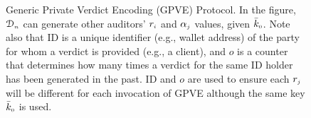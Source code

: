 \begin{figure}[!htp]
\begin{center}
\begin{tcolorbox}[enhanced,width=83mm, height=97mm, left=0mm,
    drop fuzzy shadow southwest,
    colframe=black,colback=white]
{{\begin{enumerate}[leftmargin=5.2mm]
%
%
%
%

 \end{enumerate}
}}
\end{tcolorbox}
\end{center}
\vspace{-4mm}
\caption{Generic Private Verdict Encoding  (GPVE) Protocol. In the figure, $\mathcal{D}_{\scriptscriptstyle n}$ can generate other auditors' $r_{\scriptscriptstyle i}$ and $\alpha_{\scriptscriptstyle j}$ values, given $\bar k_{\scriptscriptstyle 0}$. Note also that $\text{ID}$ is a unique identifier (e.g., wallet address) of the party for whom a verdict is provided (e.g., a client), and $o$ is a counter that determines how many times a verdict for the same ID holder has been generated in the past. $\text{ID}$ and $o$ are used to ensure each $r_{\scriptscriptstyle j}$ will be different for each invocation of GPVE  although the same key $\bar k_{\scriptscriptstyle 0}$ is used.} 
\vspace{-5mm}
\label{fig:GPVE}
\end{figure}
%
